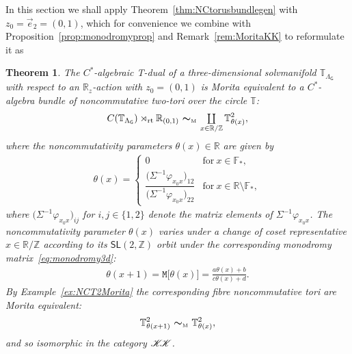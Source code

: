 \documentclass[10pt,a4paper]{amsart}
\numberwithin{equation}{section}
\newcommand{\Z}{\zed}
\newcommand{\F}{\mathbb{F}}
\newcommand{\mbf}[1]{{\boldsymbol {#1} }}
\newcommand{\CCK}{\mathscr{K}}
\newcommand{\sfG}{\mathsf{G}}
\newcommand{\sfSL}{\mathsf{SL}}
\newcommand{\ttM}{\mathtt{M}}
\newcommand{\rt}{{\rm rt}}
\newcommand{\mcoprod}{\mbox{$\coprod\limits_{x\in\R/\Z}$}}
\newcommand{\R}{\real}
\newcommand{\zed}{{\mathbb Z}} %
\newcommand{\real}{{\mathbb R}} %
\newcommand{\torus}{{\mathbb T}} %
\newtheorem{Theorem}{Theorem}[section]
\begin{document}
In this section we shall apply Theorem~\ref{thm:NCtorusbundlegen} with
$z_0=\vec e_2=(0,1)$, which for convenience we combine with
Proposition~\ref{prop:monodromyprop} and Remark~\ref{rem:MoritaKK} to reformulate it as
\begin{Theorem}\label{thm:NCtorusbundle3d}
The $C^*$-algebraic T-dual of a three-dimensional
solvmanifold $\torus_{\Lambda_\sfG}$ with respect to an $\R_z$-action
with $z_0=(0,1)$
is Morita equivalent to a $C^*$-algebra bundle
of noncommutative two-tori over the circle $\torus$:
\begin{gather*}%
C(\torus_{\Lambda_\sfG})\rtimes_\rt\real_{(0,1)}
\ \mbf\sim_{\text{\tiny M}} \ \mcoprod \,
\torus^2_{\theta(x)} ,
\end{gather*}
where the noncommutativity parameters $\theta(x)\in\R$ are given by
\begin{gather*}%
\theta(x) = \begin{cases}
 0 & \mbox{for} \ x \in \F_* , \\
\dfrac{\big(\Sigma^{-1} \varphi_{x_0 x}\big)_{12}}{\big(\Sigma^{-1} \varphi_{x_0 x}\big)_{22}}
 & \mbox{for} \ x\in\R\setminus\F_* , \end{cases}
\end{gather*}
where $\big(\Sigma^{-1} \varphi_{x_0 x}\big)_{ij}$ for $i,j\in\{1,2\}$ denote
the matrix elements of $\Sigma^{-1} \varphi_{x_0 x}$. The
noncommutativity parameter $\theta(x)$ varies under a
change of coset representative $x\in\R/\Z$
according to its $\sfSL(2,\Z)$ orbit under the corresponding monodromy
matrix~\eqref{eq:monodromy3d}:
\begin{gather}\label{eq:thetaMorita3d}
\theta(x+1) = \ttM\big[\theta(x)\big] =
\frac{a \theta(x)+b}{c \theta(x)+d} .
\end{gather}
By Example~{\rm \ref{ex:NCT2Morita}} the corresponding fibre noncommutative
tori are Morita equivalent:
\[
\torus^2_{\theta(x+1)} \ \mbf\sim_{\text{\tiny
 M}} \ \torus^2_{\theta(x)},
\]
and so isomorphic in the category ${\CCK\hspace{-1mm}\CCK}$.
\end{Theorem}
\end{document}
